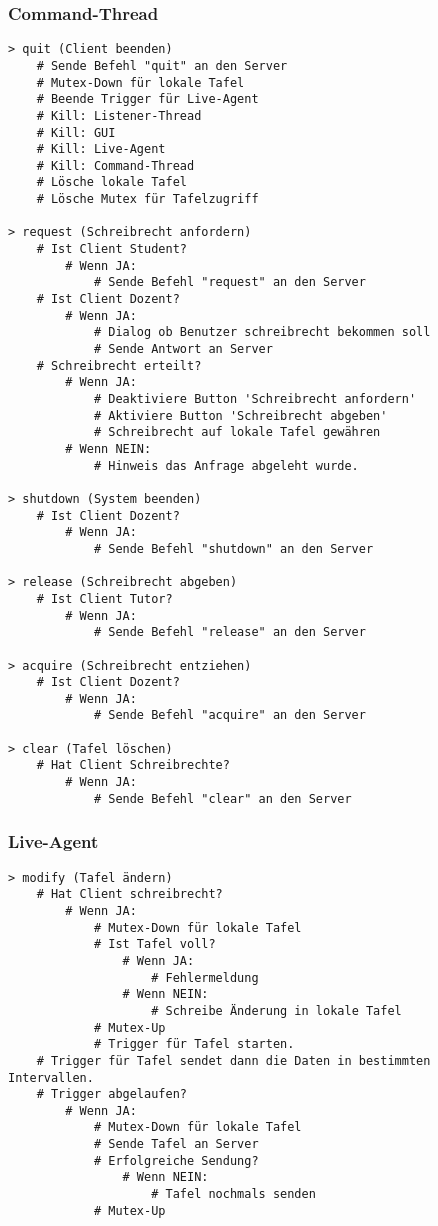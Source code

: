 \subsubsection{Command-Thread}
\begin{lstlisting}
> quit (Client beenden)
    # Sende Befehl "quit" an den Server
    # Mutex-Down für lokale Tafel
    # Beende Trigger für Live-Agent
    # Kill: Listener-Thread
    # Kill: GUI
    # Kill: Live-Agent
    # Kill: Command-Thread
    # Lösche lokale Tafel
    # Lösche Mutex für Tafelzugriff

> request (Schreibrecht anfordern)
    # Ist Client Student?
        # Wenn JA:
            # Sende Befehl "request" an den Server
    # Ist Client Dozent?
        # Wenn JA:
            # Dialog ob Benutzer schreibrecht bekommen soll
            # Sende Antwort an Server
    # Schreibrecht erteilt?
        # Wenn JA:
            # Deaktiviere Button 'Schreibrecht anfordern'
            # Aktiviere Button 'Schreibrecht abgeben'
            # Schreibrecht auf lokale Tafel gewähren
        # Wenn NEIN:
            # Hinweis das Anfrage abgeleht wurde.

> shutdown (System beenden)
    # Ist Client Dozent?
        # Wenn JA:
            # Sende Befehl "shutdown" an den Server

> release (Schreibrecht abgeben)
    # Ist Client Tutor?
        # Wenn JA:
            # Sende Befehl "release" an den Server

> acquire (Schreibrecht entziehen)
    # Ist Client Dozent?
        # Wenn JA:
            # Sende Befehl "acquire" an den Server

> clear (Tafel löschen)
    # Hat Client Schreibrechte?
        # Wenn JA:
            # Sende Befehl "clear" an den Server
\end{lstlisting}

\subsubsection{Live-Agent}
\begin{lstlisting}
> modify (Tafel ändern)
    # Hat Client schreibrecht?
        # Wenn JA:
            # Mutex-Down für lokale Tafel
            # Ist Tafel voll?
                # Wenn JA:
                    # Fehlermeldung
                # Wenn NEIN:
                    # Schreibe Änderung in lokale Tafel
            # Mutex-Up
            # Trigger für Tafel starten.
    # Trigger für Tafel sendet dann die Daten in bestimmten Intervallen.
    # Trigger abgelaufen?
        # Wenn JA:
            # Mutex-Down für lokale Tafel
            # Sende Tafel an Server
            # Erfolgreiche Sendung?
                # Wenn NEIN:
                    # Tafel nochmals senden
            # Mutex-Up
\end{lstlisting}

